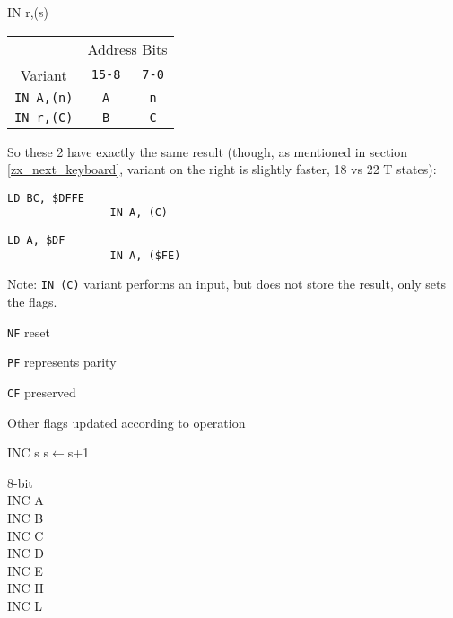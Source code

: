 \documentclass[twoside,openright,a4paper]{book}
\begin{document}
\begin{basedescript}{
	\desclabelstyle{\multilinelabel}
	\desclabelwidth{3cm}}
\begin{detailitem}{IN r,(s)}
		\begin{tabular}{ccc}
			& \multicolumn{2}{c}{Address Bits} \\
			Variant & {\tt 15-8} & {\tt 7-0} \\
			\hline
			{\tt IN A,(n)} & {\tt A} & {\tt n} \\
			{\tt IN r,(C)} & {\tt B} & {\tt C} \\
		\end{tabular}
		\vspace{1ex} %

		So these 2 have exactly the same result (though, as mentioned in section \ref{zx_next_keyboard}, variant on the right is slightly faster, 18 vs 22 T states):

		\begin{multicols}{2}
			\begin{Verbatim}[gobble=4]
				LD BC, $DFFE
				IN A, (C)
			\end{Verbatim}
			\columnbreak
			\begin{Verbatim}[gobble=4]
				LD A, $DF
				IN A, ($FE)
			\end{Verbatim}
		\end{multicols}

		Note: {\tt IN (C)} variant performs an input, but does not store the result, only sets the flags.

		\begin{DetailEffects}
			\item {\tt NF} reset 
			\item {\tt PF} represents parity
			\item {\tt CF} preserved 
			\item Other flags updated according to operation
		\end{DetailEffects}
						
		\begin{DetailTiming}
		\end{DetailTiming}

	\end{detailitem}

	\pagebreak
	\begin{detailitem}{INC s}
		{s$\leftarrow$s+1}

		\begin{DetailVariants}
			\textnormal{8-bit}\\
			INC A\\
			INC B\\
			INC C\\
			INC D\\
			INC E\\
			INC H\\
			INC L


\end{DetailVariants}
\end{detailitem}
\end{basedescript}
\end{document}

